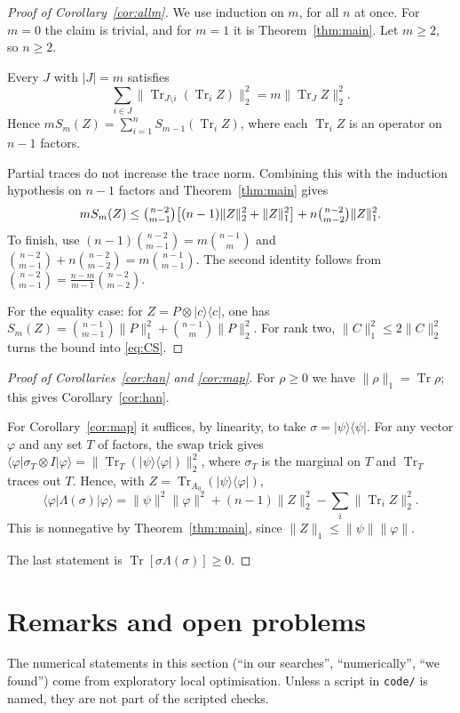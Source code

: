 \documentclass[11pt]{article}
\theoremstyle{remark}
\newcommand{\Tr}{\operatorname{Tr}}
\newcommand{\norm}[1]{\lVert #1\rVert}
\begin{document}
\begin{proof}[Proof of Corollary~\ref{cor:allm}]
We use induction on $m$, for all $n$ at once. For $m=0$ the claim is trivial, and for $m=1$ it is
Theorem~\ref{thm:main}. Let $m\ge2$, so $n\ge2$.

Every $J$ with $|J|=m$ satisfies
\[
\sum_{i\in J}\norm{\Tr_{J\setminus i}(\Tr_iZ)}_2^2=m\norm{\Tr_JZ}_2^2 .
\]
Hence $mS_m(Z)=\sum_{i=1}^nS_{m-1}(\Tr_iZ)$, where each $\Tr_iZ$ is an operator on $n-1$ factors.

Partial traces do not increase the trace norm. Combining this with the induction hypothesis on $n-1$ factors and
Theorem~\ref{thm:main} gives
\[
mS_m(Z)\le\tbinom{n-2}{m-1}\big[(n-1)\norm{Z}_2^2+\norm{Z}_1^2\big]+n\tbinom{n-2}{m-2}\norm{Z}_1^2 .
\]
To finish, use $(n-1)\binom{n-2}{m-1}=m\binom{n-1}{m}$ and $\binom{n-2}{m-1}+n\binom{n-2}{m-2}=m\binom{n-1}{m-1}$. The
second identity follows from $\binom{n-2}{m-1}=\frac{n-m}{m-1}\binom{n-2}{m-2}$.

For the equality case: for $Z=P\otimes|c\rangle\langle c|$, one has
$S_m(Z)=\binom{n-1}{m-1}\norm{P}_1^2+\binom{n-1}{m}\norm{P}_2^2$. For rank two, $\norm{C}_1^2\le2\norm{C}_2^2$ turns the
bound into \eqref{eq:CS}.
\end{proof}

\begin{proof}[Proof of Corollaries~\ref{cor:han} and \ref{cor:map}]
For $\rho\ge0$ we have $\norm{\rho}_1=\Tr\rho$; this gives Corollary~\ref{cor:han}.

For Corollary~\ref{cor:map} it suffices, by linearity, to take $\sigma=|\psi\rangle\langle\psi|$. For any vector
$\varphi$ and any set $T$ of factors, the swap trick gives
$\langle\varphi|\sigma_T\otimes I|\varphi\rangle=\norm{\Tr_T(|\psi\rangle\langle\varphi|)}_2^2$, where $\sigma_T$ is the
marginal on $T$ and $\Tr_T$ traces out $T$. Hence, with $Z=\Tr_{A_0}(|\psi\rangle\langle\varphi|)$,
\[
\langle\varphi|\Lambda(\sigma)|\varphi\rangle=\norm{\psi}^2\norm{\varphi}^2+(n-1)\norm{Z}_2^2-\sum_i\norm{\Tr_iZ}_2^2 .
\]
This is nonnegative by Theorem~\ref{thm:main}, since $\norm{Z}_1\le\norm{\psi}\norm{\varphi}$.

The last statement is $\Tr[\sigma\Lambda(\sigma)]\ge0$.
\end{proof}

\section{Remarks and open problems}\label{sec:remarks}
The numerical statements in this section (``in our searches'', ``numerically'', ``we found'') come from exploratory local optimisation. Unless a script in \texttt{code/} is named, they are not part of the scripted checks.
\end{document}

